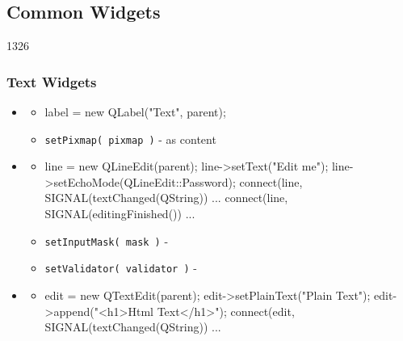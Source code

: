 %
%
%
%

\subsection{Common Widgets}

\begin{slide}[fragile]{1326}
  \frametitle{Text Widgets}
  \begin{itemize}
  \item \textbf{}
    \begin{itemize}
    \item[] \begin{cpp}
label = new QLabel("Text", parent);
     \end{cpp}
    \item \texttt{setPixmap( pixmap )} - as content
    \end{itemize}
  \item \textbf{}
    \begin{itemize}
    \item[]
      \begin{cpp}
line = new QLineEdit(parent);        
line->setText("Edit me");
line->setEchoMode(QLineEdit::Password);
connect(line, SIGNAL(textChanged(QString)) ...
connect(line, SIGNAL(editingFinished()) ...
      \end{cpp}
    \item \texttt{setInputMask( mask )} -
    \item \texttt{setValidator( validator )} - 
   \end{itemize}
  \item \textbf{}
    \begin{itemize}
    \item[]
      \begin{cpp}
edit = new QTextEdit(parent);
edit->setPlainText("Plain Text");        
edit->append("<h1>Html Text</h1>");
connect(edit, SIGNAL(textChanged(QString)) ...
      \end{cpp}
   \end{itemize}
\end{itemize}
\end{slide}


